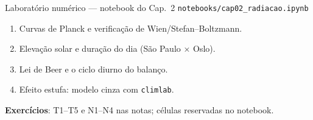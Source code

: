 \documentclass[aspectratio=169,11pt]{beamer}
\begin{document}
\begin{frame}{Laboratório numérico --- notebook do Cap.~2}
  \texttt{notebooks/cap02\_radiacao.ipynb}
  \begin{enumerate}
    \item Curvas de Planck e verificação de Wien/Stefan--Boltzmann.
    \item Elevação solar e duração do dia (São Paulo × Oslo).
    \item Lei de Beer e o ciclo diurno do balanço.
    \item Efeito estufa: modelo cinza com \texttt{climlab}.
  \end{enumerate}
  \vspace{0.4em}
  \textbf{Exercícios}: T1--T5 e N1--N4 nas notas; células reservadas no
  notebook.
  \vfill
  \atribuicao
\end{frame}
\end{document}
